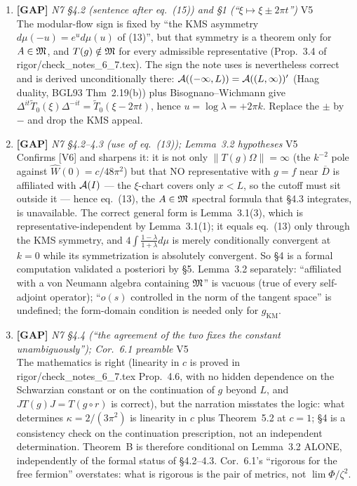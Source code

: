 \documentclass[11pt]{article}
\begin{document}
\begin{enumerate}[leftmargin=1.6em,itemsep=6pt]
\item \textbf{[GAP]} \emph{N7 \S4.2 (sentence after eq.\ (15)) and \S1 (``\(\xi\mapsto\xi\pm2\pi t\)'')} \hfill\textsc{V5}\\ The modular-flow sign is fixed by ``the KMS asymmetry \(d\mu(-u)=e^ud\mu(u)\) of (13)'', but that symmetry is a theorem only for \(A\in\mathfrak M\), and \(T(g)\notin\mathfrak M\) for every admissible representative (Prop.\ 3.4 of rigor/check\_notes\_6\_7.tex). The sign the note uses is nevertheless correct and is derived unconditionally there: \(\mathcal A((-\infty,L))=\mathcal A((L,\infty))'\) (Haag duality, BGL93 Thm~2.19(b)) plus Bisognano--Wichmann give \(\Delta^{it}\widetilde T_0(\xi)\Delta^{-it}=\widetilde T_0(\xi-2\pi t)\), hence \(u=\log\lambda=+2\pi k\). Replace the \(\pm\) by \(-\) and drop the KMS appeal.
\item \textbf{[GAP]} \emph{N7 \S4.2--4.3 (use of eq.\ (13)); Lemma~3.2 hypotheses} \hfill\textsc{V5}\\ Confirms [V6] and sharpens it: it is not only \(\|T(g)\Omega\|=\infty\) (the \(k^{-2}\) pole against \(\widehat W(0)=c/48\pi^2\)) but that NO representative with \(g=f\) near \(\overline D\) is affiliated with \(\mathcal A(I)\) --- the \(\xi\)-chart covers only \(x<L\), so the cutoff must sit outside it --- hence eq.\ (13), the \(A\in\mathfrak M\) spectral formula that \S4.3 integrates, is unavailable. The correct general form is Lemma~3.1(3), which is representative-independent by Lemma~3.1(1); it equals eq.\ (13) only through the KMS symmetry, and \(4\int\frac{1-\lambda}{1+\lambda}d\mu\) is merely conditionally convergent at \(k=0\) while its symmetrization is absolutely convergent. So \S4 is a formal computation validated a posteriori by \S5. Lemma~3.2 separately: ``affiliated with a von Neumann algebra containing \(\mathfrak M\)'' is vacuous (true of every self-adjoint operator); ``\(o(s)\) controlled in the norm of the tangent space'' is undefined; the form-domain condition is needed only for \(g_{\mathrm{KM}}\).
\item \textbf{[GAP]} \emph{N7 \S4.4 (``the agreement of the two fixes the constant unambiguously''); Cor.\ 6.1 preamble} \hfill\textsc{V5}\\ The mathematics is right (linearity in \(c\) is proved in rigor/check\_notes\_6\_7.tex Prop.\ 4.6, with no hidden dependence on the Schwarzian constant or on the continuation of \(g\) beyond \(L\), and \(JT(g)J=T(g\circ r)\) is correct), but the narration misstates the logic: what determines \(\kappa=2/(3\pi^2)\) is linearity in \(c\) plus Theorem~5.2 at \(c=1\); \S4 is a consistency check on the continuation prescription, not an independent determination. Theorem~B is therefore conditional on Lemma~3.2 ALONE, independently of the formal status of \S4.2--4.3. Cor.\ 6.1's ``rigorous for the free fermion'' overstates: what is rigorous is the pair of metrics, not \(\lim\Phi/\zeta^2\).

\end{enumerate}
\end{document}
